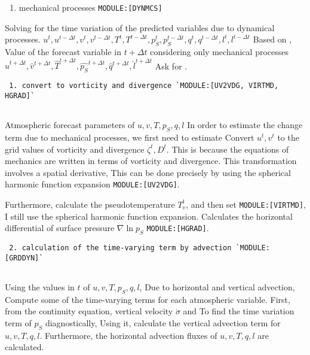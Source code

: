 \begin{enumerate}
\def\labelenumi{\arabic{enumi}.}
\setcounter{enumi}{3}
\tightlist
\item
  mechanical processes \texttt{MODULE:{[}DYNMCS{]}}
\end{enumerate}

Solving for the time variation of the predicted variables due to
dynamical processes.
\(u^{t}, u^{t-\Delta t}, v^{t}, v^{t-\Delta t}, T^{t}, T^{t-\Delta t}, p_S^{t}, p_S^{t-\Delta t}, q^{t}, q^{t-\Delta t}, l^{t}, l^{t-\Delta t}\)
Based on , Value of the forecast variable in \(t+\Delta t\) considering
only mechanical processes
\(\hat{u}^{t+\Delta t}, \hat{v}^{t+\Delta t}, \hat{T}^{t+\Delta t}, \hat{p_S}^{t+\Delta t}, \hat{q}^{t+\Delta t}, \hat{l}^{t+\Delta t}\)
Ask for .

\begin{verbatim}
 1. convert to vorticity and divergence `MODULE:[UV2VDG, VIRTMD, HGRAD]`
     
\end{verbatim}

Atmospheric forecast parameters of \(u, v, T, p_S, q, l\) In order to
estimate the change term due to mechanical processes, we first need to
estimate Convert \(u^{t}, v^{t}\) to the grid values of vorticity and
divergence \(\zeta^{t},D^{t}\). This is because the equations of
mechanics are written in terms of vorticity and divergence. This
transformation involves a spatial derivative, This can be done precisely
by using the spherical harmonic function expansion
\texttt{MODULE:{[}UV2VDG{]}}.

Furthermore, calculate the pseudotemperature \(T_v^{t}\), and then set
\texttt{MODULE:{[}VIRTMD{]}}, I still use the spherical harmonic
function expansion. Calculates the horizontal differential of surface
pressure \(\nabla \ln p_S\) \texttt{MODULE:{[}HGRAD{]}}.

\begin{verbatim}
 2. calculation of the time-varying term by advection `MODULE:[GRDDYN]`
     
\end{verbatim}

Using the values in \(t\) of \(u, v, T, p_S, q, l\), Due to horizontal
and vertical advection, Compute some of the time-varying terms for each
atmospheric variable. First, from the continuity equation, vertical
velocity \(\dot{\sigma}\) and To find the time variation term of \(p_S\)
diagnostically, Using it, calculate the vertical advection term for
\(u, v, T, q, l\). Furthermore, the horizontal advection fluxes of
\(u, v, T, q, l\) are calculated.

